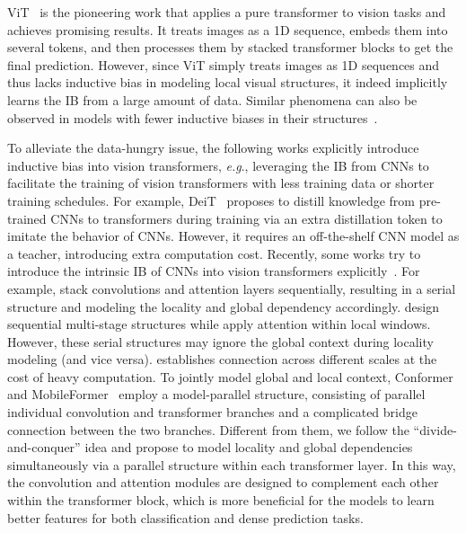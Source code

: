 \documentclass[twocolumn]{svjour3}          \smartqed  \usepackage{natbib}
\newcommand{\eg}{e.g}
\def\onedot{.\xspace}
\def\eg{\emph{e.g}\onedot}
\begin{document}
ViT~\citep{dosovitskiy2020image} is the pioneering work that applies a pure transformer to vision tasks and achieves promising results. It treats images as a 1D sequence, embeds them into several tokens, and then processes them by stacked transformer blocks to get the final prediction. However, since ViT simply treats images as 1D sequences and thus lacks inductive bias in modeling local visual structures, it indeed implicitly learns the IB from a large amount of data. Similar phenomena can also be observed in models with fewer inductive biases in their structures~\citep{tolstikhin2021mlp,el2021xcit,he2021gauge}.

To alleviate the data-hungry issue, the following works explicitly introduce inductive bias into vision transformers, \eg, leveraging the IB from CNNs to facilitate the training of vision transformers with less training data or shorter training schedules. For example, DeiT~\citep{touvron2020training} proposes to distill knowledge from pre-trained CNNs to transformers during training via an extra distillation token to imitate the behavior of CNNs. However, it requires an off-the-shelf CNN model as a teacher, introducing extra computation cost. Recently, some works try to introduce the intrinsic IB of CNNs into vision transformers explicitly~\citep{han2021transformer,peng2021conformer,graham2021levit,li2021localvit,d2021convit,yan2021contnet,wu2021cvt,yuan2021incorporating,chen2021crossvit,liu2021swin}. For example, \citep{li2021localvit,graham2021levit,wu2021cvt,dai2021coatnet} stack convolutions and attention layers sequentially, resulting in a serial structure and modeling the locality and global dependency accordingly. \citep{wang2021pyramid} design sequential multi-stage structures while \citep{liu2021swin} apply attention within local windows. However, these serial structures may ignore the global context during locality modeling (and vice versa). \citep{wang2021crossformer} establishes connection across different scales at the cost of heavy computation. To jointly model global and local context, Conformer~\citep{peng2021conformer} and MobileFormer~\citep{chen2021mobile} employ a model-parallel structure, consisting of parallel individual convolution and transformer branches and a complicated bridge connection between the two branches. Different from them, we follow the ``divide-and-conquer'' idea and propose to model locality and global dependencies simultaneously via a parallel structure within each transformer layer. In this way, the convolution and attention modules are designed to complement each other within the transformer block, which is more beneficial for the models to learn better features for both classification and dense prediction tasks.
\end{document}

